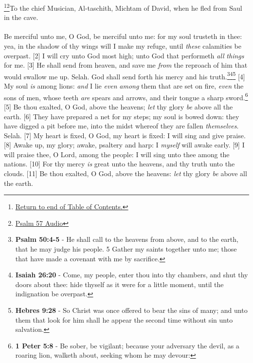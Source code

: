 \footnote{\textcolor[cmyk]{0.99998,1,0,0}{\hyperlink{TOC}{Return to end of Table of Contents.}}}\footnote{\href{https://audiobible.com/bible/psalms_57.html}{\textcolor[cmyk]{0.99998,1,0,0}{Psalm 57 Audio}}}\textcolor[cmyk]{0.99998,1,0,0}{To the chief Musician, Al-taschith, Michtam of David, when he fled from Saul in the cave.}\\
\\
\textcolor[cmyk]{0.99998,1,0,0}{Be merciful unto me, O God, be merciful unto me: for my soul trusteth in thee: yea, in the shadow of thy wings will I make my refuge, until \emph{these} calamities be overpast.}
[2] \textcolor[cmyk]{0.99998,1,0,0}{I will cry unto God most high; unto God that performeth \emph{all} \emph{things} for me.}
[3] \textcolor[cmyk]{0.99998,1,0,0}{He shall send from heaven, and save me \emph{from} the reproach of him that would swallow me up. Selah. God shall send forth his mercy and his truth.}\footnote{\textbf{Psalm 50:4-5} - He shall call to the heavens from above, and to the earth, that he may judge his people. 5 Gather my saints together unto me; those that have made a covenant with me by sacrifice.}\footnote{\textbf{Isaiah 26:20} - Come, my people, enter thou into thy chambers, and shut thy doors about thee: hide thyself as it were for a little moment, until the indignation be overpast.}\footnote{\textbf{Hebres 9:28} - So Christ was once offered to bear the sins of many; and unto them that look for him shall he appear the second time without sin unto salvation.}
[4] \textcolor[cmyk]{0.99998,1,0,0}{My soul \emph{is} among lions: \emph{and} I lie \emph{even} \emph{among} them that are set on fire, \emph{even} the sons of men, whose teeth \emph{are} spears and arrows, and their tongue a sharp sword.}\footnote{\textbf{1 Peter 5:8} -  Be sober, be vigilant; because your adversary the devil, as a roaring lion, walketh about, seeking whom he may devour:}
[5] \textcolor[cmyk]{0.99998,1,0,0}{Be thou exalted, O God, above the heavens; \emph{let} thy glory \emph{be} above all the earth.}
[6] \textcolor[cmyk]{0.99998,1,0,0}{They have prepared a net for my steps; my soul is bowed down: they have digged a pit before me, into the midst whereof they are fallen \emph{themselves}. Selah.}
[7] \textcolor[cmyk]{0.99998,1,0,0}{My heart is fixed, O God, my heart is fixed: I will sing and give praise.}
[8] \textcolor[cmyk]{0.99998,1,0,0}{Awake up, my glory; awake, psaltery and harp: I \emph{myself} will awake early.}
[9] \textcolor[cmyk]{0.99998,1,0,0}{I will praise thee, O Lord, among the people: I will sing unto thee among the nations.}
[10] \textcolor[cmyk]{0.99998,1,0,0}{For thy mercy \emph{is} great unto the heavens, and thy truth unto the clouds.}
[11] \textcolor[cmyk]{0.99998,1,0,0}{Be thou exalted, O God, above the heavens: \emph{let} thy glory \emph{be} above all the earth.}


